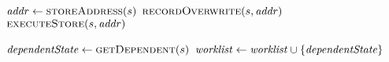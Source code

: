 \begin{algorithm}
\begin{algorithmic}[1]
    \label{alg:casestore-begin}
      \State $\addr \gets \Call{storeAddress}{\workstate}$
      \State $\Call{recordOverwrite}{\workstate,\addr}$     \label{alg:record-overwrite}
      \State $\Call{executeStore}{\workstate,\addr}$     \label{alg:store-normal}
      \label{alg:store-check-recovery}
      \State {}
      \label{alg:store-udpate-dep-states}



     \EndIf
    \EndCase \label{alg:casestore-end}
     \label{alg:caseexit-begin}
       \label{alg:exit-check-recovery}
        \State {} \label{alg:exit-terminate-recovery}
        \State $\dependentState \gets  \Call{getDependent}{\workstate}$
        \label{alg:exit-extract-dependent}
        \State {} \label{alg:exit-resume}
        \State $\mathit{worklist} \gets  \mathit{worklist} \cup \{\mathit{dependentState}\}$
      \Else
        \State {}  \label{alg:exit-normal}
        \label{alg:push-worklist-exit}
    \EndIf
    \EndCase \label{alg:caseexit-end}

    \EndSwitch
  \EndWhile
  \EndFunction
\end{algorithmic}
\end{algorithm}

